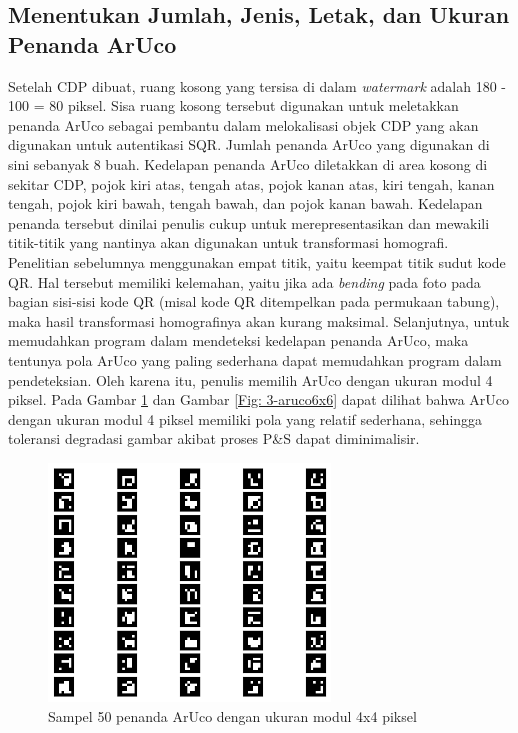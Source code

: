 \subsection{Menentukan Jumlah, Jenis, Letak, dan Ukuran Penanda ArUco}
Setelah CDP dibuat, ruang kosong yang tersisa di dalam \emph{watermark} adalah 180 - 100 = 80 piksel. Sisa ruang kosong tersebut digunakan untuk meletakkan
penanda ArUco sebagai pembantu dalam melokalisasi objek CDP yang akan digunakan untuk autentikasi SQR. Jumlah penanda ArUco yang digunakan di sini sebanyak 8
buah. Kedelapan penanda ArUco diletakkan di area kosong di sekitar CDP, pojok kiri atas, tengah atas, pojok kanan atas, kiri tengah, kanan tengah, pojok kiri
bawah, tengah bawah, dan pojok kanan bawah. Kedelapan penanda tersebut dinilai penulis cukup untuk merepresentasikan dan mewakili titik-titik yang nantinya
akan digunakan untuk transformasi homografi. Penelitian sebelumnya menggunakan empat titik, yaitu keempat titik sudut kode QR. Hal tersebut memiliki kelemahan,
yaitu jika ada \emph{bending} pada foto pada bagian sisi-sisi kode QR (misal kode QR ditempelkan pada permukaan tabung), maka hasil transformasi homografinya
akan kurang maksimal. Selanjutnya, untuk memudahkan program dalam mendeteksi kedelapan penanda ArUco, maka tentunya pola ArUco yang paling sederhana dapat
memudahkan program dalam pendeteksian. Oleh karena itu, penulis memilih ArUco dengan ukuran modul 4 piksel. Pada Gambar \ref{Fig: 3-aruco4x4} dan Gambar
\ref{Fig: 3-aruco6x6} dapat dilihat bahwa ArUco dengan ukuran modul 4 piksel memiliki pola yang relatif sederhana, sehingga toleransi degradasi gambar akibat
proses P\&S dapat diminimalisir.

\begin{figure}[h]
	\centering
	\includegraphics[width=7.5cm]{contents/chapter-3/3-aruco4x4.png}
	\caption{Sampel 50 penanda ArUco dengan ukuran modul 4x4 piksel}
	\label{Fig: 3-aruco4x4}
\end{figure}

